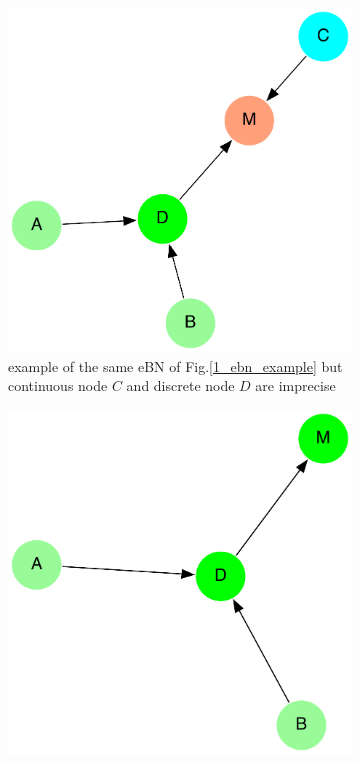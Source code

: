 \begin{figure}[h]
    \centering
    \begin{subfigure}{0.45\textwidth}
        \centering
        \includegraphics[width=\linewidth]{imgs/pdfs/5_imprecise_ebn.pdf}
        \caption{example of the same eBN of Fig.\ref{1_ebn_example} but continuous node $C$ and discrete node $D$ are imprecise}\label{1_imp_ebn}
    \end{subfigure}
    \hfill
    \begin{subfigure}{0.45\textwidth}
        \centering
        \includegraphics[width=\linewidth]{imgs/pdfs/6_imprecise_rbn.pdf}

\end{subfigure}
\end{figure}
